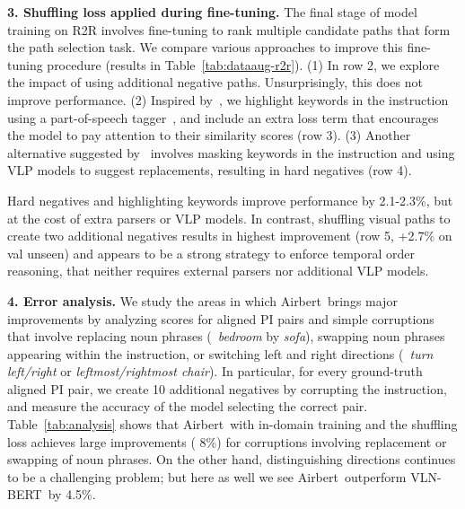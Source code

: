 \RequirePackage[dvipsnames,table]{xcolor} \documentclass[10pt,twocolumn,letterpaper]{article}
\newcommand{\p}[1]{\vspace{1mm}\noindent\textbf{#1}}
\newcommand{\vlnbert}{VLN-BERT}
\newcommand{\airbert}{Airbert}
\begin{document}
\p{3. Shuffling loss applied during fine-tuning.}
The final stage of model training on R2R involves fine-tuning to rank multiple candidate paths that form the path selection task.
We compare various approaches to improve this fine-tuning procedure (results in Table~\ref{tab:dataaug-r2r}).
(1) In row 2, we explore the impact of using additional negative paths.
Unsurprisingly, this does not improve performance.
(2) Inspired by~\cite{gupta2020contrastive}, we highlight keywords in the instruction using a part-of-speech tagger~\cite{joshi2018parser}, and include an extra loss term that encourages the model to pay attention to their similarity scores (row 3).
(3) Another alternative suggested by~\cite{gupta2020contrastive} involves masking keywords in the instruction and using VLP models to suggest replacements, resulting in hard negatives (row 4).

Hard negatives and highlighting keywords improve performance by 2.1-2.3\%, but at the cost of extra parsers or VLP models.
In contrast, shuffling visual paths to create two additional negatives results in highest improvement (row 5, +2.7\% on val unseen) and appears to be a strong strategy to enforce temporal order reasoning, that neither requires external parsers nor additional VLP models.



















\p{4. Error analysis.}
We study the areas in which \airbert~brings major improvements by analyzing scores for aligned PI pairs and simple corruptions that involve replacing noun phrases (\eg~\emph{bedroom} by \emph{sofa}), swapping noun phrases appearing within the instruction, or switching left and right directions (\eg~\emph{turn left/right} or \emph{leftmost/rightmost chair}).
In particular, for every ground-truth aligned PI pair, we create 10 additional negatives by corrupting the instruction, and measure the accuracy of the model selecting the correct pair.
Table~\ref{tab:analysis} shows that \airbert~with in-domain training and the shuffling loss achieves large improvements ( 8\%) for corruptions involving replacement or swapping of noun phrases.
On the other hand, distinguishing directions continues to be a challenging problem; but here as well we see \airbert~outperform \vlnbert~by 4.5\%.
\end{document}
